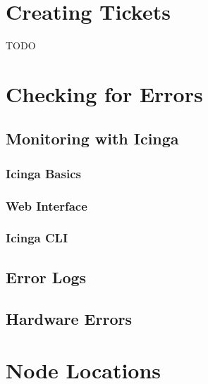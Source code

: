 \documentclass[10pt,letterpaper]{article}
\begin{document}
\section{Creating Tickets}
    TODO
\clearpage

\section{Checking for Errors}
    \subsection{Monitoring with Icinga}
        \subsubsection{Icinga Basics}
        \subsubsection{Web Interface}
        \subsubsection{Icinga CLI}
    \subsection{Error Logs}
    \subsection{Hardware Errors}
\clearpage


\appendix
\section{Node Locations}
\clearpage
\end{document}
